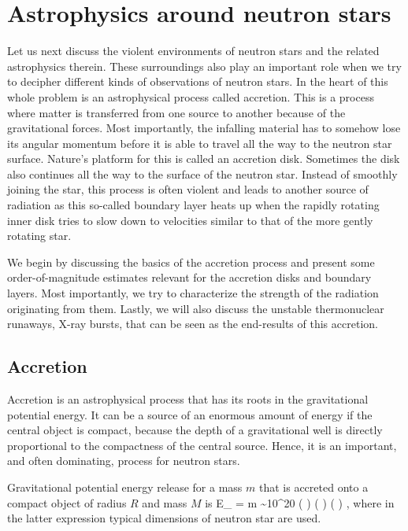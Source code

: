 \chapter{Astrophysics around neutron stars}

Let us next discuss the violent environments of neutron stars and the related astrophysics therein.
These surroundings also play an important role when we try to decipher different kinds of observations of neutron stars.
In the heart of this whole problem is an astrophysical process called accretion.
This is a process where matter is transferred from one source to another because of the gravitational forces.
Most importantly, the infalling material has to somehow lose its angular momentum before it is able to travel all the way to the neutron star surface.
Nature's platform for this is called an accretion disk.
Sometimes the disk also continues all the way to the surface of the neutron star.
Instead of smoothly joining the star, this process is often violent and leads to another source of radiation as this so-called boundary layer heats up when the rapidly rotating inner disk tries to slow down to velocities similar to that of the more gently rotating star.

We begin by discussing the basics of the accretion process and present some order-of-magnitude estimates relevant for the accretion disks and boundary layers.
Most importantly, we try to characterize the strength of the radiation originating from them.
Lastly, we will also discuss the unstable thermonuclear runaways, X-ray bursts, that can be seen as the end-results of this accretion.


\section{Accretion}

Accretion is an astrophysical process that has its roots in the gravitational potential energy.
It can be a source of an enormous amount of energy if the central object is compact, because the depth of a gravitational well is directly proportional to the compactness of the central source.
Hence, it is an important, and often dominating, process for neutron stars.\cite[For an introduction, see e.g., ][]{FKR02}

Gravitational potential energy release for a mass $m$ that is accreted onto a compact object of radius $R$ and mass $M$ is
\be
\Delta E_{} = m  \sim 10^{20} \left(  \right) \left(  \right) \left(  \right) \erg,
\ee
where in the latter expression typical dimensions of neutron star are used.

